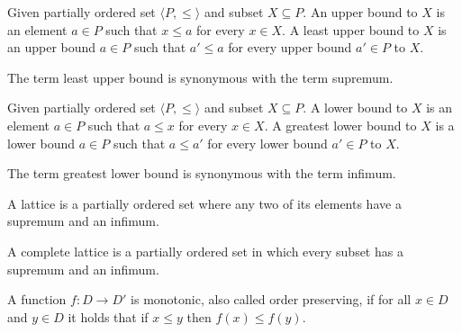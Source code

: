 \begin{definition}
	Given partially ordered set $\langle P,\leq \rangle$ and subset $X \subseteq P$. An upper bound to $X$ is an element $a \in P$ such that $x \leq a$ for every $x\in X$. A least upper bound to $X$ is an upper bound $a \in P$ such that $a' \leq a$ for every upper bound $a' \in P$ to $X$.  
	
	The term least upper bound is synonymous with the term supremum.
\end{definition}
\begin{definition}
	Given partially ordered set $\langle P,\leq \rangle$ and subset $X \subseteq P$. A lower bound to $X$ is an element $a \in P$ such that $a \leq x$ for every $x\in X$. A greatest lower bound to $X$ is a lower bound $a \in P$ such that $a \leq a'$ for every lower bound $a' \in P$ to $X$. 
	
	The term greatest lower bound is synonymous with the term infimum.
\end{definition}

\begin{definition}
	A lattice is a partially ordered set where any two of its elements have a supremum and an infimum.
\end{definition}

\begin{definition}
	A complete lattice is a partially ordered set in which every subset has a supremum and an infimum.
\end{definition}

\begin{definition}
	A function $f : D \rightarrow D'$ is monotonic, also called order preserving, if for all $x \in D$ and $y \in D$ it holds that if $x \leq y$ then $f(x) \leq f(y)$.
\end{definition}
